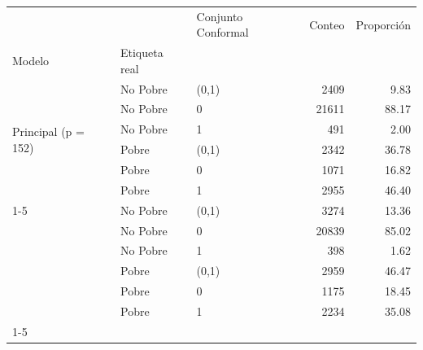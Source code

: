 \begin{tabular}{lllrr}
\toprule
 &  & Conjunto Conformal & Conteo & Proporción \\
Modelo & Etiqueta real &  &  &  \\
\midrule
\multirow[t]{6}{*}{Principal (p = 152)} & No Pobre & (0,1) & 2409 & 9.83 \\
 & No Pobre & 0 & 21611 & 88.17 \\
 & No Pobre & 1 & 491 & 2.00 \\
 & Pobre & (0,1) & 2342 & 36.78 \\
 & Pobre & 0 & 1071 & 16.82 \\
 & Pobre & 1 & 2955 & 46.40 \\
\cline{1-5}
\multirow[t]{6}{*}{Restringido (p = 10)} & No Pobre & (0,1) & 3274 & 13.36 \\
 & No Pobre & 0 & 20839 & 85.02 \\
 & No Pobre & 1 & 398 & 1.62 \\
 & Pobre & (0,1) & 2959 & 46.47 \\
 & Pobre & 0 & 1175 & 18.45 \\
 & Pobre & 1 & 2234 & 35.08 \\
\cline{1-5}
\bottomrule
\end{tabular}
